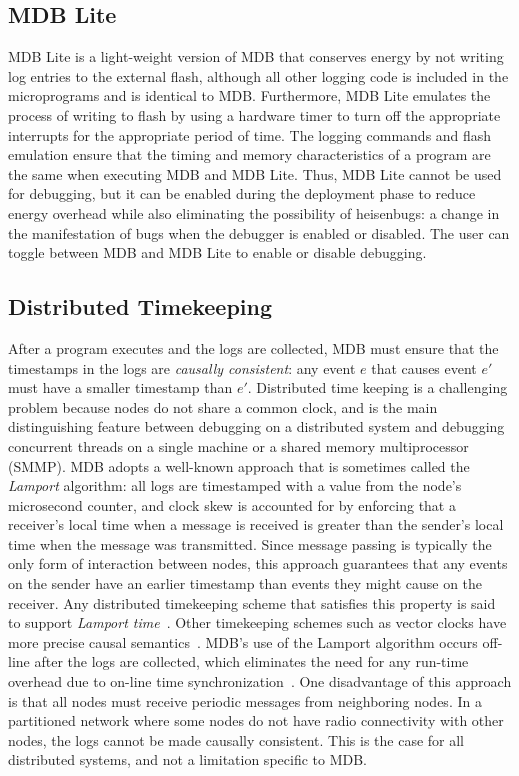 \subsection{MDB Lite} \label{mdbLight}

MDB Lite is a light-weight version of MDB that conserves energy by not writing
log entries to the external flash, although all other logging code is included
in the microprograms and is identical to MDB\@.  Furthermore, MDB Lite emulates
the process of writing to flash by using a hardware timer to turn off the
appropriate interrupts for the appropriate period of time.  The logging commands
and flash emulation ensure that the timing and memory characteristics of a
program are the same when executing MDB and MDB Lite.  Thus, MDB Lite cannot be
used for debugging, but it can be enabled during the deployment phase to reduce
energy overhead while also eliminating the possibility of heisenbugs: a change
in the manifestation of bugs when the debugger is enabled or disabled.  The user
can toggle between MDB and MDB Lite to enable or disable debugging.

\subsection{Distributed Timekeeping} \label{time}

After a program executes and the logs are collected, MDB must ensure that the
timestamps in the logs are \emph{causally consistent}: any event $e$ that causes
event $e'$ must have a smaller timestamp than $e'$.  Distributed time keeping is
a challenging problem because nodes do not share a common clock, and is the main
distinguishing feature between debugging on a distributed system and debugging
concurrent threads on a single machine or a shared memory multiprocessor (SMMP).
MDB adopts a well-known approach that is sometimes called the \emph{Lamport}
algorithm: all logs are timestamped with a value from the node's microsecond
counter, and clock skew is accounted for by enforcing that a receiver's local
time when a message is received is greater than the sender's local time when the
message was transmitted.  Since message passing is typically the only form of
interaction between nodes, this approach guarantees that any events on the
sender have an earlier timestamp than events they might cause on the receiver.
Any distributed timekeeping scheme that satisfies this property is said to
support \emph{Lamport time}~\cite{Lamport1978}.  Other timekeeping schemes such
as vector clocks have more precise causal
semantics~\cite{Mattern1989,Fidge1991}.  MDB's use of the Lamport algorithm
occurs off-line after the logs are collected, which eliminates the need for any
run-time overhead due to on-line time
synchronization~\cite{Elson2002,Maroti2004}.  One disadvantage of this approach
is that all nodes must receive periodic messages from neighboring nodes.  In a
partitioned network where some nodes do not have radio connectivity with other
nodes, the logs cannot be made causally consistent.  This is the case for all
distributed systems, and not a limitation specific to MDB.

